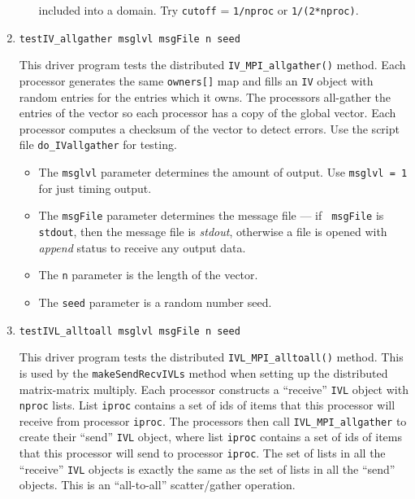 \begin{enumerate}
\begin{itemize}
included into a domain. Try {\tt cutoff} = {\tt 1/nproc}
or {\tt 1/(2*nproc)}.
\end{itemize}
\item
\begin{verbatim}
testIV_allgather msglvl msgFile n seed 
\end{verbatim}
This driver program tests the distributed 
{\tt IV\_MPI\_allgather()} method.
Each processor generates the same {\tt owners[]} map
and fills an {\tt IV} object with random entries for the entries
which it owns.
The processors all-gather the entries of the vector so each
processor has a copy of the global vector.
Each processor computes a checksum of the vector to detect errors.
Use the script file {\tt do\_IVallgather} for testing.
\par
\begin{itemize}
\item
The {\tt msglvl} parameter determines the amount of output.
Use {\tt msglvl = 1} for just timing output.
\item
The {\tt msgFile} parameter determines the message file --- if {\tt
msgFile} is {\tt stdout}, then the message file is {\it stdout},
otherwise a file is opened with {\it append} status to receive any
output data.
\item
The {\tt n} parameter is the length of the vector.
\item
The {\tt seed} parameter is a random number seed.
\end{itemize}
\item
\begin{verbatim}
testIVL_alltoall msglvl msgFile n seed
\end{verbatim}
This driver program tests the distributed {\tt IVL\_MPI\_alltoall()}
method.
This is used by the {\tt makeSendRecvIVLs} method when setting up
the distributed matrix-matrix multiply.
Each processor constructs a ``receive'' {\tt IVL} object with 
{\tt nproc} lists.
List {\tt iproc} contains a set of ids of items that this processor
will receive from processor {\tt iproc}.
The processors then call {\tt IVL\_MPI\_allgather} to create their
``send'' {\tt IVL} object,
where list {\tt iproc} contains a set of ids of items that 
this processor will send to processor {\tt iproc}.
The set of lists in all the ``receive'' {\tt IVL} objects is
exactly the same as the set of lists in all the ``send'' objects.
This is an ``all-to-all'' scatter/gather operation.

\end{enumerate}

